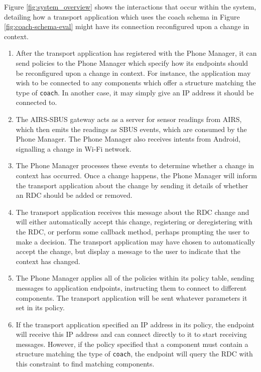 \documentclass[12pt,twoside,notitlepage]{report}
\begin{document}
Figure \ref{fig:system_overview} shows the interactions that occur within the system, detailing how a transport application which uses the coach schema in Figure \ref{fig:coach-schema-eval} might have its connection reconfigured upon a change in context.

\begin{enumerate}

\item After the transport application has registered with the Phone Manager, it can send policies to the Phone Manager which specify how its endpoints should be reconfigured upon a change in context. For instance, the application may wish to be connected to any components which offer a structure matching the type of {\tt coach}. In another case, it may simply give an IP address it should be connected to.

\item The AIRS-SBUS gateway acts as a server for sensor readings from AIRS, which then emits the readings as SBUS events, which are consumed by the Phone Manager. The Phone Manager also receives intents from Android, signalling a change in Wi-Fi network.

\item The Phone Manager processes these events to determine whether a change in context has occurred. Once a change happens, the Phone Manager will inform the transport application about the change by sending it details of whether an RDC should be added or removed. 

\item The transport application receives this message about the RDC change and will either automatically accept this change, registering or deregistering with the RDC, or perform some callback method, perhaps prompting the user to make a decision. The transport application may have chosen to automatically accept the change, but display a message to the user to indicate that the context has changed.

\item The Phone Manager applies all of the policies within its policy table, sending messages to application endpoints, instructing them to connect to different components. The transport application will be sent whatever parameters it set in its policy.

\item If the transport application specified an IP address in its policy, the endpoint will receive this IP address and can connect directly to it to start receiving messages. However, if the policy specified that a component must contain a structure matching the type of {\tt coach}, the endpoint will query the RDC with this constraint to find matching components.


\end{enumerate}
\end{document}
